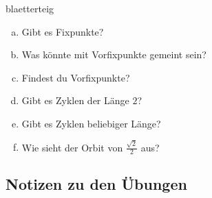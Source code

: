 \documentclass[%
<<<<<<< Updated upstream
<<<<<<< Updated upstream
11pt,%
twoside,%
titlepage,%
german,%
headsepline%
]{scrartcl}
\begin{document}
\begin{uebenv}{blaetterteig}
\begin{enumerate}[a)]
    \item Gibt es Fixpunkte?
    \item Was könnte mit Vorfixpunkte gemeint sein?
    \item Findest du Vorfixpunkte?
    \item Gibt es Zyklen der Länge $2$?
    \item Gibt es Zyklen beliebiger Länge?
    \item Wie sieht der Orbit von $\frac{\sqrt{2}}{2}$ aus?
\end{enumerate}
\end{uebenv}

\clearpage

\subsection{Notizen zu den Übungen}
\end{document}
